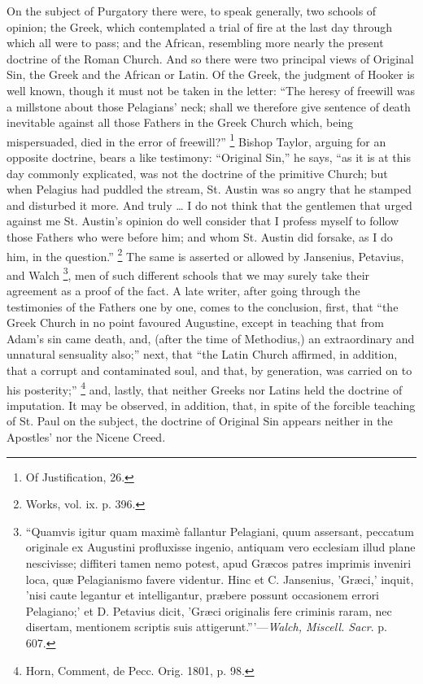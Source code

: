On the subject of Purgatory there were, to speak
generally, two schools of opinion; the Greek, which
contemplated a trial of fire at the last day through
which all were to pass; and the African, resembling more
nearly the present doctrine of the Roman Church. And so
there were two principal views of Original Sin, the Greek
and the African or Latin. Of the Greek, the judgment of
Hooker is well known, though it must not be taken in the
letter: ``The heresy of freewill was a millstone
about those Pelagians' neck; shall we therefore give
sentence of death inevitable against all those Fathers in
the Greek Church which, being mispersuaded, died in the
error of freewill?'' \footnote{Of Justification, 26.} Bishop Taylor, arguing for
an opposite doctrine, bears a like testimony:
``Original Sin,'' he says, ``as it is at this
day commonly explicated, was not the doctrine of the
primitive Church; but when Pelagius had puddled the
stream, St. Austin was so angry that he stamped and
disturbed it more. And truly … I do not think that
the gentlemen that urged against me St. Austin's opinion
do well consider that I profess myself to follow those
Fathers who were before him; and whom St. Austin did
forsake, as I do him, in the question.'' \footnote{Works, vol. ix. p. 396.} The
same is asserted or allowed by Jansenius, Petavius, and
Walch \footnote{``Quamvis igitur quam
maximè fallantur Pelagiani, quum assersant, peccatum
originale ex Augustini profluxisse ingenio, antiquam vero
ecclesiam illud plane nescivisse; diffiteri tamen nemo
potest, apud Græcos patres imprimis inveniri loca, quæ
Pelagianismo favere videntur. Hinc et C. Jansenius,
'Græci,' inquit, 'nisi caute legantur et intelligantur, præbere possunt occasionem errori Pelagiano;' et D.
Petavius dicit, 'Græci originalis fere criminis raram,
nec disertam, mentionem scriptis suis
attigerunt.'''—\emph{Walch, Miscell. Sacr}. p.
607.},
men of such different schools that we may surely take
their agreement as a proof of the fact. A late writer,
after going through the testimonies of the Fathers one by
one, comes to the conclusion, first, that ``the Greek
Church in no point favoured Augustine, except in teaching
that from Adam's sin came death, and, (after the time of
Methodius,) an extraordinary and unnatural sensuality
also;'' next, that ``the Latin Church affirmed,
in addition, that a corrupt and contaminated soul, and
that, by generation, was carried on to his
posterity;'' \footnote{Horn, Comment, de Pecc. Orig.
1801, p. 98.} and, lastly, that neither Greeks nor Latins held the doctrine of imputation. It may
be observed, in addition, that, in spite of the forcible
teaching of St. Paul on the subject, the doctrine of
Original Sin appears neither in the Apostles' nor the
Nicene Creed.

